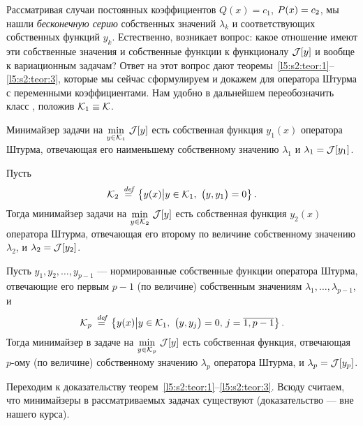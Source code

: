 Рассматривая случаи постоянных коэффициентов $Q(x)=c_1$, $P(x)\?=c_2${\mb,} мы нашли \emph{бесконечную серию} собственных значений $\lambda_k$ и соответствующих собственных функций $y_k$. Естественно{\mb,} возникает вопрос: какое отношение имеют эти собственные значения и собственные функции к функционалу $\mathcal{J}[y]$ и вообще к вариационным задачам? Ответ на этот вопрос дают теоремы~\ref{l5:s2:teor:1}--\ref{l5:s2:teor:3}, которые мы сейчас сформулируем и докажем для оператора Штурма с переменными коэффициентами. Нам удобно в дальнейшем переобозначить класс \K, положив $\mathcal{K}_1\equiv\mathcal{K}$.
\begin{Teor}
	\label{l5:s2:teor:1}
	Минимайзер задачи на $\displaystyle\min\limits_{y\in\mathcal{K}_1}\,\mathcal{J}[y]$ есть собственная функция $y_1(x)$ оператора Штурма, отвечающая его наименьшему собственному значению $\lambda_1$ и $\lambda_1=\mathcal{J}[y_1]$.
\end{Teor}
\begin{Teor}
	\label{l5:s2:teor:2}
	Пусть
	\begin{equation*}
		\K_2\eqdef\left\{y(x)\middle|y\in\K_1,\ \big(y,y_1\big)=0\right\}.
	\end{equation*} 
	Тогда минимайзер задачи на $\displaystyle\min\limits_{y\in\mathcal{K}_2}\,\mathcal{J}[y]$ есть собственная функция $y_2(x)$ оператора Штурма{\mb,} отвечающая его второму по величине собственному значению $\lambda_2${\mb,} и $\lambda_2=\mathcal{J}[y_2]$.
\end{Teor}
\begin{Teor}
	\label{l5:s2:teor:3}
	Пусть $y_1,y_2,\ldots,y_{p-1}$ --- нормированные собственные функции оператора Штурма, отвечающие его первым $p-1$ (по величине) собственным значениям $\lambda_1,\ldots,\lambda_{p-1}${\mb,} и 
	\begin{equation*}
		\displaystyle\K_p\eqdef\left\{y(x)\middle|y\in\K_1,\ \big(y,y_j\big)=0,\,j=\overline{1,p-1}\right\}.
	\end{equation*}
	Тогда минимайзер в задаче на $\displaystyle\min\limits_{y\in\mathcal{K}_p}\,\mathcal{J}[y]$ есть собственная функция, отвечающая $p$-ому (по величине) собственному значению $\lambda_p$ оператора Штурма{\mb,} и $\lambda_p=\mathcal{J}[y_p]$.  
\end{Teor}
Переходим к доказательству теорем~\ref{l5:s2:teor:1}--\ref{l5:s2:teor:3}. 	Всюду считаем, что минимайзеры в рассматриваемых задачах существуют (доказательство --- вне нашего курса). 
